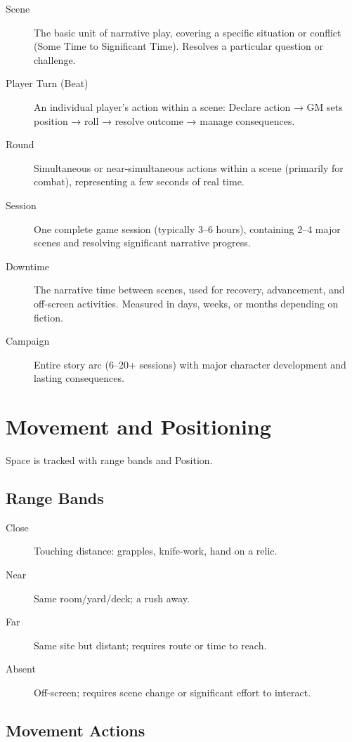 \documentclass[11pt,twoside,openany]{book}
\begin{document}
\begin{description}
\item[Scene] The basic unit of narrative play, covering a specific situation or conflict (Some Time to Significant Time). Resolves a particular question or challenge.
\item[Player Turn (Beat)] An individual player's action within a scene: Declare action → GM sets position → roll → resolve outcome → manage consequences.
\item[Round] Simultaneous or near-simultaneous actions within a scene (primarily for combat), representing a few seconds of real time.
\item[Session] One complete game session (typically 3–6 hours), containing 2–4 major scenes and resolving significant narrative progress.
\item[Downtime] The narrative time between scenes, used for recovery, advancement, and off-screen activities. Measured in days, weeks, or months depending on fiction.
\item[Campaign] Entire story arc (6–20+ sessions) with major character development and lasting consequences.
\end{description}

\section*{Movement and Positioning} 

Space is tracked with range bands and Position.

\subsection*{Range Bands}

\begin{description}
\item[Close] Touching distance: grapples, knife-work, hand on a relic.
\item[Near] Same room/yard/deck; a rush away.
\item[Far] Same site but distant; requires route or time to reach.
\item[Absent] Off-screen; requires scene change or significant effort to interact.
\end{description}

\subsection*{Movement Actions}
\end{document}
